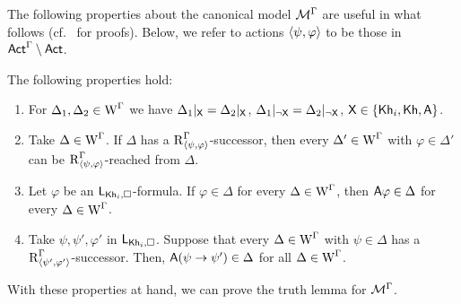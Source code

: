 
The following properties about the canonical model $\mathcal{M}^\Gamma$ are useful in what follows (cf.~\cite{Wang2016,AFSVQ23report} for proofs). Below, we refer to actions $\langle \psi,\varphi \rangle$ to be those in ${\rm \sf Act}^\Gamma\setminus{\rm \sf Act}$.

\medskip

\begin{proposition} \label{pro:canonical} The following properties hold:
	\begin{enumerate}
		\item \label{pro:cm-ults-khiml-allsame}
For $\Delta_1, \Delta_2 \in \operatorname{W}^\Gamma$ we have $\Delta_1|_{{\mathsf{X}}} = \Delta_2|_{{\mathsf{X}}}$, $\Delta_1|_{\lnot{\mathsf{X}}} = \Delta_2|_{\lnot{\mathsf{X}}}$, ${\mathsf{X}} \in \{ {\sf Kh}_i,{\sf Kh},{\sf A} \}$.

\item\label{pro:cm-ults-khiml-oneall}
Take $\Delta \in \operatorname{W}^\Gamma$. If $\Delta$ has a $\operatorname{R}^\Gamma_{\langle \psi,\varphi \rangle}$-successor, then every $\Delta' \in \operatorname{W}^\Gamma$ with $\varphi \in \Delta'$ can be $\operatorname{R}^\Gamma_{\langle \psi,\varphi \rangle}$-reached from $\Delta$.

\item \label{pro:cm-ults-khiml-allall}
Let $\varphi$ be an $\mathsf{L}_{{\sf Kh}_i,\square}$-formula. If $\varphi \in \Delta$ for every $\Delta \in \operatorname{W}^\Gamma$, then ${\sf A}\varphi \in \Delta$ for every $\Delta \in \operatorname{W}^\Gamma$.

\item\label{pro:cm-ults-khiml-succpre}
Take $\psi, \psi', \varphi'$ in $\mathsf{L}_{{\sf Kh}_i,\square}$. Suppose that every $\Delta \in \operatorname{W}^\Gamma$ with $\psi \in \Delta$ has a $\operatorname{R}^{\Gamma}_{\langle \psi',\varphi' \rangle}$-successor. Then, ${\sf A}(\psi \rightarrow \psi') \in \Delta$ for all $\Delta \in \operatorname{W}^\Gamma$.
	\end{enumerate}
\end{proposition}

\medskip

With these properties at hand, we can prove the truth lemma for $\mathcal{M}^\Gamma$.

\medskip


